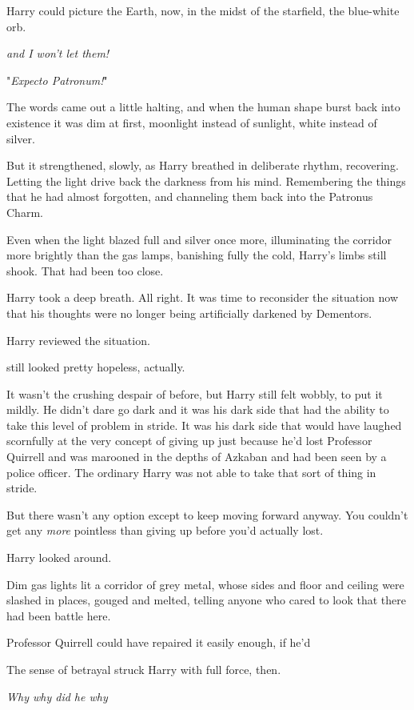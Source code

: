 Harry could picture the Earth, now, in the midst of the starfield, the
blue-white orb.

\emph{{\el} and I won't let them!}

"\emph{Expecto Patronum!}"

The words came out a little halting, and when the human shape burst back into
existence it was dim at first, moonlight instead of sunlight, white instead of
silver.

But it strengthened, slowly, as Harry breathed in deliberate rhythm,
recovering. Letting the light drive back the darkness from his mind.
Remembering the things that he had almost forgotten, and channeling them back
into the Patronus Charm.

Even when the light blazed full and silver once more, illuminating the corridor
more brightly than the gas lamps, banishing fully the cold, Harry's limbs still
shook. That had been too close.

Harry took a deep breath. All right. It was time to reconsider the situation
now that his thoughts were no longer being artificially darkened by Dementors.

Harry reviewed the situation.

{\el} still looked pretty hopeless, actually.

It wasn't the crushing despair of before, but Harry still felt wobbly, to put
it mildly. He didn't dare go dark and it was his dark side that had the ability
to take this level of problem in stride. It was his dark side that would have
laughed scornfully at the very concept of giving up just because he'd lost
Professor Quirrell and was marooned in the depths of Azkaban and had been seen
by a police officer. The ordinary Harry was not able to take that sort of thing
in stride.

But there wasn't any option except to keep moving forward anyway. You couldn't
get any \emph{more} pointless than giving up before you'd actually lost.

Harry looked around.

Dim gas lights lit a corridor of grey metal, whose sides and floor and ceiling
were slashed in places, gouged and melted, telling anyone who cared to look
that there had been battle here.

Professor Quirrell could have repaired it easily enough, if he'd{\el}

The sense of betrayal struck Harry with full force, then.

\emph{Why{\el} why did he{\el} why{\el}}

